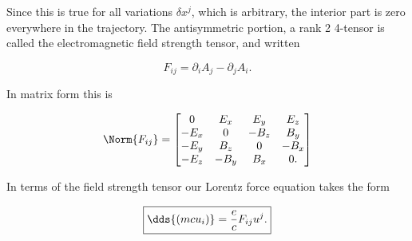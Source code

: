 Since this is true for all variations $\delta x^j$, which is arbitrary, the interior part is zero everywhere in the trajectory.  The antisymmetric portion, a rank 2 4-tensor is called the electromagnetic field strength tensor, and written

\begin{equation}\label{eqn:relativisticElectrodynamicsL10:350}
\boxed{
F_{ij} = \partial_i A_j - \partial_j A_i.
}
\end{equation}

In matrix form this is

\begin{equation}\label{eqn:relativisticElectrodynamicsL10:370}
\Norm{ F_{ij} } = 
\begin{bmatrix}
0 & E_x & E_y & E_z \\
-E_x & 0 & -B_z & B_y \\
-E_y & B_z & 0 & -B_x \\
-E_z & -B_y & B_x & 0.
\end{bmatrix}
\end{equation}

In terms of the field strength tensor our Lorentz force equation takes the form

\begin{equation}\label{eqn:relativisticElectrodynamicsL10:390}
\boxed{
\dds{(m c u_i)} = \frac{e}{c} F_{ij} u^j.
}
\end{equation}

\EndArticle
